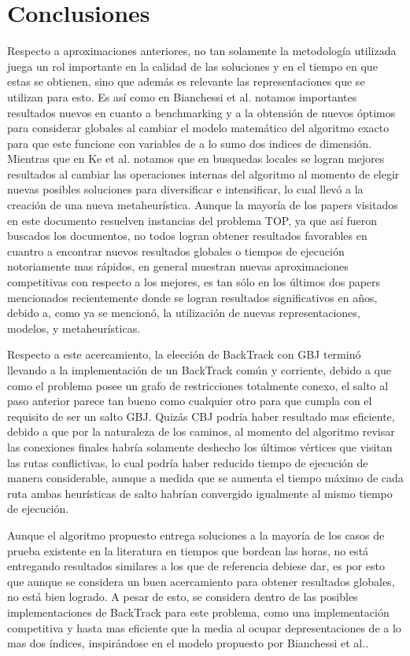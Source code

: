 \section{Conclusiones}\label{conclusions}
Respecto a aproximaciones anteriores, no tan solamente la metodolog\'ia utilizada juega un rol importante en la calidad de las soluciones y en el tiempo en que estas se obtienen, sino que adem\'as es relevante las representaciones que se utilizan para esto. Es as\'i como en Bianchessi et al.\cite{doi:10.1111/itor.12422} notamos importantes resultados nuevos en cuanto a benchmarking y a la obtensi\'on de nuevos \'optimos para considerar globales al cambiar el modelo matem\'atico del algoritmo exacto para que este funcione con variables de a lo sumo dos indices de dimensi\'on. Mientras que en Ke et al.\cite{KE2016155} notamos que en busquedas locales se logran mejores resultados al cambiar las operaciones internas del algoritmo al momento de elegir nuevas posibles soluciones para diversificar e intensificar, lo cual llev\'o a la creaci\'on de una nueva metaheur\'istica. Aunque la mayor\'ia de los papers visitados en este documento resuelven instancias del problema TOP, ya que as\'i fueron buscados los documentos, no todos logran obtener resultados favorables en cuantro a encontrar nuevos resultados globales o tiempos de ejecuci\'on notoriamente mas r\'apidos, en general muestran nuevas aproximaciones competitivas con respecto a los mejores, es tan s\'olo en los \'ultimos dos papers mencionados recientemente donde se logran resultados significativos en a\~nos, debido a, como ya se mencion\'o, la utilizaci\'on de nuevas representaciones, modelos, y metaheur\'isticas.

Respecto a este acercamiento, la elecci\'on de BackTrack con GBJ termin\'o llevando a la implementaci\'on de un BackTrack com\'un y corriente, debido a que como el problema posee un grafo de restricciones totalmente conexo, el salto al paso anterior parece tan bueno como cualquier otro para que cumpla con el requisito de ser un salto GBJ. Quiz\'as CBJ podr\'ia haber resultado mas eficiente, debido a que por la naturaleza de los caminos, al momento del algoritmo revisar las conexiones finales habr\'ia solamente deshecho los \'ultimos v\'ertices que visitan las rutas conflictivas, lo cual podr\'ia haber reducido tiempo de ejecuci\'on de manera considerable, aunque a medida que se aumenta el tiempo m\'aximo de cada ruta ambas heur\'isticas de salto habr\'ian convergido igualmente al mismo tiempo de ejecuci\'on.

Aunque el algoritmo propuesto entrega soluciones a la mayor\'ia de los casos de prueba existente en la literatura en tiempos que bordean las horas, no est\'a entregando resultados similares a los que de referencia debiese dar, es por esto que aunque se considera un buen acercamiento para obtener resultados globales, no est\'a bien logrado. A pesar de esto, se considera dentro de las posibles implementaciones de BackTrack para este problema, como una implementaci\'on competitiva y hasta mas eficiente que la media al ocupar depresentaciones de a lo mas dos \'indices, inspir\'andose en el modelo propuesto por Bianchessi et al.\cite{doi:10.1111/itor.12422}.

